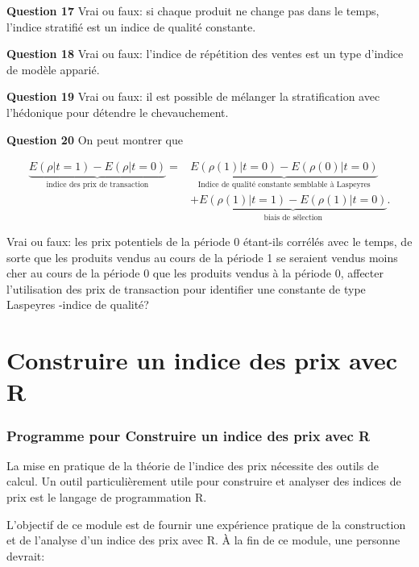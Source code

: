 \documentclass[
]{article}
\begin{document}
\textbf{Question 17} Vrai ou faux: si chaque produit ne change pas dans le temps, l'indice stratifié est un indice de qualité constante.

\textbf{Question 18} Vrai ou faux: l'indice de répétition des ventes est un type d'indice de modèle apparié.

\textbf{Question 19} Vrai ou faux: il est possible de mélanger la stratification avec l'hédonique pour détendre le chevauchement.

\textbf{Question 20} On peut montrer que

\begin{align*}
\underbrace{E(\rho | t = 1) - E(\rho | t = 0)}_{\text{indice des prix de transaction}} =& \underbrace{E(\rho(1) | t = 0 ) - E(\rho(0) | t = 0)}_{\text{Indice de qualité constante semblable à Laspeyres}} \\
& + \underbrace{E(\rho(1) | t = 1) - E(\rho(1) | t = 0)}_{\text{biais de sélection}}.
\end{align*}

Vrai ou faux: les prix potentiels de la période 0 étant-ils corrélés avec le temps, de sorte que les produits vendus au cours de la période 1 se seraient vendus moins cher au cours de la période 0 que les produits vendus à la période 0, affecter l'utilisation des prix de transaction pour identifier une constante de type Laspeyres -indice de qualité?

\hypertarget{part-construire-un-indice-des-prix-avec-r}{%
\part{Construire un indice des prix avec R}\label{part-construire-un-indice-des-prix-avec-r}}

\hypertarget{programme-pour-construire-un-indice-des-prix-avec-r}{%
\section{Programme pour Construire un indice des prix avec R}\label{programme-pour-construire-un-indice-des-prix-avec-r}}

La mise en pratique de la théorie de l'indice des prix nécessite des outils de calcul. Un outil particulièrement utile pour construire et analyser des indices de prix est le langage de programmation R.

L'objectif de ce module est de fournir une expérience pratique de la construction et de l'analyse d'un indice des prix avec R. À la fin de ce module, une personne devrait:
\end{document}
